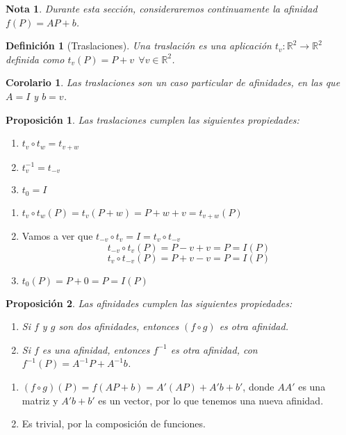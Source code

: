 \documentclass[11pt, a4paper]{article}
\makeatletter
\newif\IfInSansMode
\let\oldsf\sffamily
\renewcommand*{\sffamily}{\oldsf\mathversion{sans}\InSansModetrue}
\let\oldnorm\normalfont
\renewcommand*{\normalfont}{\oldnorm\InSansModefalse\mathversion{normal}}
\renewenvironment{proof}[1][\proofname] {\vspace{-15pt}\par\pushQED{\qed}\normalfont\topsep6\p@\@plus6\p@\relax\trivlist\item[\hskip\labelsep\it#1\@addpunct{.}]\ignorespaces}{\popQED\endtrivlist\@endpefalse}
\newcommand{\R}{\mathbb{R}}
\renewenvironment{proof}[1][\proofname] {\par\pushQED{\qed}\normalfont\topsep6\p@\@plus6\p@\relax\trivlist\item[\hskip\labelsep\itshape\sffamily#1\@addpunct{.}]\ignorespaces}{\popQED\endtrivlist\@endpefalse}
\theoremstyle{theorem-style}
\newtheorem{nprop}{Proposición}[section]
\newtheorem{ncor}{Corolario}[section]
\theoremstyle{definition-style}
\newtheorem{ndef}{Definición}[section]
\theoremstyle{remark-style}
\newtheorem*{nota}{Nota}
\theoremstyle{example-style}
\newenvironment{nlist}
{\begin{enumerate}
    \renewcommand\labelenumi{(\emph{\roman{enumi})}}}
  {\end{enumerate}}
\makeatother
\begin{document}
\begin{nota}
  Durante esta sección, consideraremos continuamente la afinidad $f(P) = AP + b $.
\end{nota}

\begin{ndef}[Traslaciones]
  Una traslación es una aplicación $t_v: \R^2 \rightarrow \R^2$ definida como $t_v(P) = P + v \ \ \forall v \in \R^2$.
\end{ndef}

\begin{ncor}
    \item Las traslaciones son un caso particular de afinidades, en las que $A = I$ y $b = v$.
\end{ncor}

\begin{nprop}
  Las traslaciones cumplen las siguientes propiedades:
  \begin{nlist}
  \item $\displaystyle t_v \circ t_w = t_{v+w}$
  \item $t_{v}^{-1} = t_{-v}$
  \item $t_0 = I$
  \end{nlist}
\end{nprop}
\begin{proof}\hfill
  \begin{nlist}
  \item $t_v \circ t_w (P) = t_v(P+w) = P+w+v = t_{v+w}(P)$
  \item Vamos a ver que $t_{-v}\circ t_v = I = t_v \circ t_{-v}$
    $$
    t_{-v}\circ t_v (P) = P-v+v = P = I(P)$$
    $$t_v\circ t_{-v}(P) = P+v-v = P = I(P)
    $$
  \item $t_0(P) = P +0 = P = I(P)$
  \end{nlist}
\end{proof}

\begin{nprop}
  Las afinidades cumplen las siguientes propiedades:
  \begin{nlist}
    \item Si $f$ y $g$ son dos afinidades, entonces $(f \circ g)$ es otra afinidad.
    \item Si $f$ es una afinidad, entonces  $f^{-1}$ es otra afinidad, con $f^{-1}(P) = A^{-1}P +A^{-1}b$.
  \end{nlist}
\end{nprop}
\begin{proof}\hfill
  \begin{nlist}
  \item $(f\circ g)(P) = f(AP +b) = A'(AP)+A'b +b' $, donde $AA'$ es una matriz y $A'b+b'$ es un vector, por lo que tenemos una nueva afinidad.
  \item Es trivial, por la composición de funciones.
  \end{nlist}
\end{proof}
\end{document}
